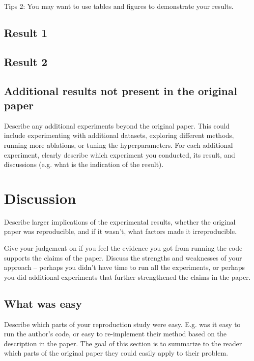 \documentclass[11pt,a4paper]{article}
\begin{document}
Tips 2: You may want to use tables and figures to demonstrate your results.


\subsection{Result 1}

\subsection{Result 2}

\subsection{Additional results not present in the original paper}

Describe any additional experiments beyond the original paper. This could include experimenting with additional datasets, exploring different methods, running more ablations, or tuning the hyperparameters. For each additional experiment, clearly describe which experiment you conducted, its result, and discussions (e.g. what is the indication of the result).

\section{Discussion}

Describe larger implications of the experimental results, whether the original paper was reproducible, and if it wasn’t, what factors made it irreproducible. 

Give your judgement on if you feel the evidence you got from running the code supports the claims of the paper. Discuss the strengths and weaknesses of your approach -- perhaps you didn't have time to run all the experiments, or perhaps you did additional experiments that further strengthened the claims in the paper.

\subsection{What was easy}
Describe which parts of your reproduction study were easy. E.g. was it easy to run the author's code, or easy to re-implement their method based on the description in the paper. The goal of this section is to summarize to the reader which parts of the original paper they could easily apply to their problem. 
\end{document}
